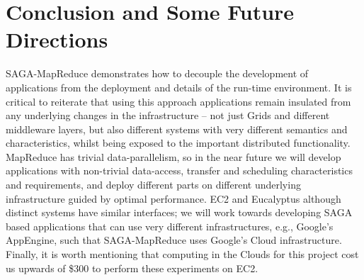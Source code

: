 \documentclass[conference,final]{IEEEtran}
\newcommand{\sagamapreduce }{SAGA-MapReduce }
\begin{document}
\section{Conclusion and Some Future Directions}



\sagamapreduce demonstrates how to decouple the development of
applications from the deployment and details of the run-time
environment.  It is critical to reiterate that using this approach
applications remain insulated from any underlying changes in the
infrastructure -- not just Grids and different middleware layers, but
also different systems with very different semantics and
characteristics, whilst being exposed to the important distributed
functionality. %
MapReduce has trivial data-parallelism, so in the near future we will
develop applications with non-trivial data-access, transfer and
scheduling characteristics and requirements, and deploy different
parts on different underlying infrastructure guided by optimal
performance.  EC2 and Eucalyptus although distinct systems have
similar interfaces; we will work towards developing SAGA based
applications that can use very different infrastructures, e.g., Google's
AppEngine, such that \sagamapreduce uses Google's Cloud
infrastructure.  Finally, it is worth mentioning that computing in the
Clouds for this project cost us upwards of \$300 to perform these
experiments on EC2.




\end{document}

